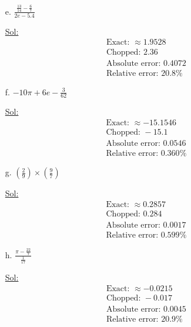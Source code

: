 \begin{enumerate}
\begin{itemize}
    \item[e.] \( \frac{\frac{13}{14} - \frac{6}{7}}{2e - 5.4} \)

      \underline{Sol:}\\
      \[
        \begin{array}{l}
          \textrm{Exact: } \approx 1.9528 \\
          \textrm{Chopped: } 2.36 \\
          \textrm{Absolute error: } 0.4072 \\
          \textrm{Relative error: } 20.8\%
        \end{array}
      \]
      \bigbreak

    \item[f.] \( -10\pi + 6e - \frac{3}{62} \)

      \underline{Sol:}\\
      \[
        \begin{array}{l}
          \textrm{Exact: } \approx -15.1546 \\
          \textrm{Chopped: } -15.1 \\
          \textrm{Absolute error: } 0.0546 \\
          \textrm{Relative error: } 0.360\%
        \end{array}
      \]
      \bigbreak

    \item[g.] \( \left( \frac{2}{9} \right) \times \left( \frac{9}{7} \right) \)

      \underline{Sol:}\\
      \[
        \begin{array}{l}
          \textrm{Exact: } \approx 0.2857 \\
          \textrm{Chopped: } 0.284 \\
          \textrm{Absolute error: } 0.0017 \\
          \textrm{Relative error: } 0.599\%
        \end{array}
      \]
      \bigbreak

    \item[h.] \( \frac{\pi - \frac{22}{7}}{\frac{1}{17}} \)

      \underline{Sol:}\\
      \[
        \begin{array}{l}
          \textrm{Exact: } \approx -0.0215 \\
          \textrm{Chopped: } -0.017 \\
          \textrm{Absolute error: } 0.0045 \\
          \textrm{Relative error: } 20.9\%
        \end{array}
      \]
      \bigbreak
  \end{itemize}


\end{enumerate}
